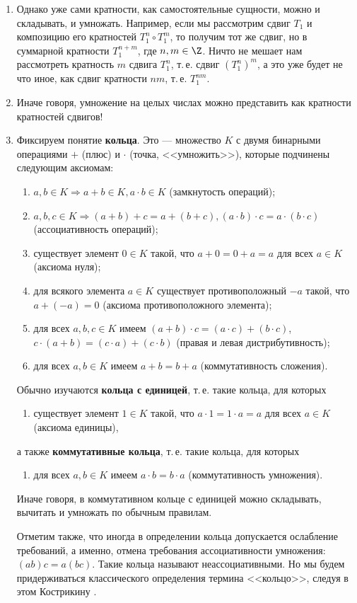 \begin{enumerate}
\item Однако уже сами кратности, как самостоятельные сущности, можно и складывать, и умножать. Например, если мы рассмотрим сдвиг $T_1$ и композицию его кратностей $T_1^n\circ T_1^m$, то получим тот же сдвиг, но в суммарной кратности $T_1^{n+m}$, где $n,m\in\Z$. Ничто не мешает нам рассмотреть кратность $m$ сдвига $T_1^n$, т.\,е. сдвиг $(T_1^n)^m$, а это уже будет не что иное, как сдвиг кратности $nm$, т.\,е. $T_1^{nm}$.
\item Иначе говоря, умножение на целых числах можно представить как кратности кратностей сдвигов!

\item Фиксируем понятие \textbf{кольца}. Это --- множество $K$ с двумя бинарными операциями $+$ (плюс) и $\cdot$ (точка, <<умножить>>), которые подчинены следующим аксиомам:\label{Ring}
\begin{enumerate}[{\bf R}1]
\item $a,b\in K\Rightarrow a+b\in K, a\cdot b\in K$ (замкнутость операций);
\item $a,b,c\in K\Rightarrow (a+b)+c=a+(b+c), (a\cdot b)\cdot c = a\cdot (b\cdot c)$ (ассоциативность операций);
\item существует элемент $0\in K$ такой, что $a+0=0+a=a$ для всех $a\in K$ (аксиома нуля);
\item для всякого элемента $a\in K$ существует противоположный $-a$ такой, что $a+(-a)=0$ (аксиома противоположного элемента);
\item для всех $a,b,c\in K$ имеем $(a+b)\cdot c=(a\cdot c)+(b\cdot c)$, $c\cdot(a+b)=(c\cdot a)+(c\cdot b)$ (правая и левая дистрибутивность);
\item для всех $a,b\in K$ имеем $a+b=b+a$ (коммутативность сложения).
\end{enumerate}

Обычно изучаются \textbf{кольца с единицей}, т.\,е. такие кольца, для которых
\begin{enumerate}[resume*]
\item существует элемент $1\in K$ такой, что $a\cdot 1=1\cdot a=a$ для всех $a\in K$ (аксиома единицы),
\end{enumerate}
а также \textbf{коммутативные кольца}, т.\,е. такие кольца, для которых
\begin{enumerate}[resume*]
\item для всех $a,b\in K$ имеем $a\cdot b=b\cdot a$ (коммутативность умножения).
\end{enumerate}

Иначе говоря, в коммутативном кольце с единицей можно складывать, вычитать и умножать по обычным правилам.

Отметим также, что иногда в определении кольца допускается ослабление требований, а именно, отмена требования ассоциативности умножения: $(ab)c = a(bc)$. Такие кольца называют неассоциативными. Но мы будем придерживаться классического определения термина <<кольцо>>, следуя в этом Кострикину \cite{Kostrikin}.
\end{enumerate}



